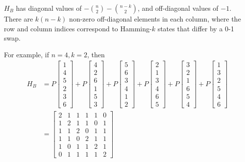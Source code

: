 \documentclass[12pt]{article}
\begin{document}
$H_B$ has diagonal values of $-\binom{n}{2}-\binom{n-k}{2}$, and off-diagonal values of $-1$. There are $k(n-k)$ non-zero off-diagonal elements in each column, where the row and column indices correspond to Hamming-$k$ states that differ by a 0-1 swap. 

For example, if $n = 4, k = 2$, then
\begin{align}
	H_B &= P{\begin{bmatrix} 1 \\ 4 \\ 5 \\ 2 \\ 3 \\ 6 \end{bmatrix}} + P{\begin{bmatrix} 4 \\ 2 \\ 6 \\ 1 \\ 5 \\ 3 \end{bmatrix}} + P{\begin{bmatrix} 5 \\ 6 \\ 3 \\ 4 \\ 1 \\ 2 \end{bmatrix}} + P{\begin{bmatrix} 2 \\ 1 \\ 3 \\ 4 \\ 6 \\ 5 \end{bmatrix}} + P{\begin{bmatrix} 3 \\ 2 \\ 1 \\ 6 \\ 5 \\ 4 \end{bmatrix}} + P{\begin{bmatrix} 1 \\ 3 \\ 2 \\ 5 \\ 4 \\ 6 \end{bmatrix}} \\
	&= \begin{bmatrix}
		2 & 1 & 1 & 1 & 1 & 0 \\
		1 & 2 & 1 & 1 & 0 & 1 \\
		1 & 1 & 2 & 0 & 1 & 1 \\
		1 & 1 & 0 & 2 & 1 & 1 \\
		1 & 0 & 1 & 1 & 2 & 1 \\
		0 & 1 & 1 & 1 & 1 & 2 \end{bmatrix}
\end{align}
\end{document}
